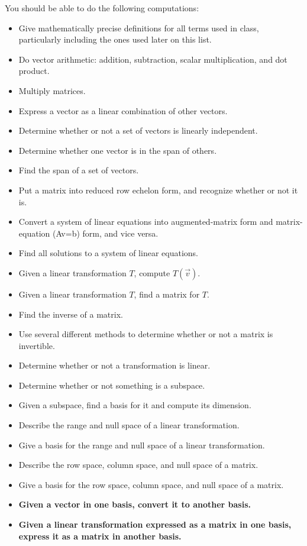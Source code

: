 \documentclass[10pt]{article}
\begin{document}
You should be able to do the following computations:
\begin{itemize}
	\item Give mathematically precise definitions for all terms used in class, particularly including the ones used later on this list.
	\item Do vector arithmetic: addition, subtraction, scalar multiplication, and dot product.
	\item Multiply matrices.
	\item Express a vector as a linear combination of other vectors.
	\item Determine whether or not a set of vectors is linearly independent.
	\item Determine whether one vector is in the span of others.
	\item Find the span of a set of vectors.
	\item Put a matrix into reduced row echelon form, and recognize whether or not it is.
	\item Convert a system of linear equations into augmented-matrix form and matrix-equation (Av=b) form, and vice versa.
	\item Find all solutions to a system of linear equations.
	\item Given a linear transformation $T$, compute $T(\vec{v})$.
	\item Given a linear transformation $T$, find a matrix for $T$.
	\item Find the inverse of a matrix.
	\item Use several different methods to determine whether or not a matrix is invertible.
	\item Determine whether or not a transformation is linear.
	\item Determine whether or not something is a subspace.
	\item Given a subspace, find a basis for it and compute its dimension.
	\item Describe the range and null space of a linear transformation.
	\item Give a basis for the range and null space of a linear transformation.
	\item Describe the row space, column space, and null space of a matrix.
	\item Give a basis for the row space, column space, and null space of a matrix.
	\item \textbf{Given a vector in one basis, convert it to another basis.}
	\item \textbf{Given a linear transformation expressed as a matrix in one basis, express it as a matrix in another basis.}

\end{itemize}
\end{document}
